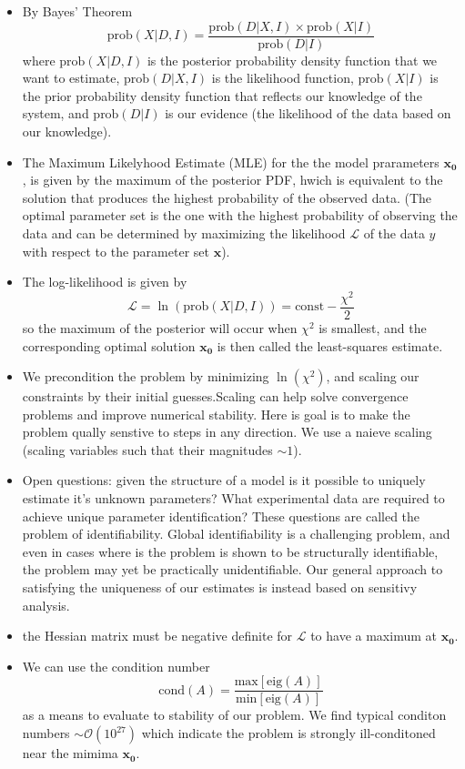 \documentclass[10pt,a4paper]{article}
\begin{document}
\begin{itemize}
\item By Bayes' Theorem
\[\mbox{prob}(X|D, I) = \frac{\mbox{prob}(D|X,I) \times \mbox{prob}(X|I)}{\mbox{prob}(D|I)}\]
where $\mbox{prob}(X|D, I)$ is the posterior probability density function that we want to estimate, $\mbox{prob}(D|X,I)$ is the likelihood function, $\mbox{prob}(X|I)$ is the prior probability density function that reflects our knowledge of the system, and $\mbox{prob}(D|I)$ is our evidence (the likelihood of the data based on our knowledge).
\item The Maximum Likelyhood Estimate (MLE) for the the model prarameters $\mathbf{x_0}$, is given by the maximum of the posterior PDF, hwich is equivalent to the solution that produces the highest probability of the observed data. (The optimal parameter set is the one with the highest probability of
observing the data and can be determined by maximizing the likelihood $\mathcal{L}$ of the data $y$ with respect to the parameter set $\mathbf{x}$).
\item The log-likelihood is given by
\[\mathcal{L} = \ln(\mbox{prob}(X|D, I)) = \mbox{const} - \frac{\chi^2}{2}\]
so the maximum of the posterior will occur when $\chi^2$ is smallest, and the corresponding optimal solution $\mathbf{x_0}$ is then called the least-squares estimate.
\item We precondition the problem by minimizing $\ln(\chi^2)$, and scaling our constraints by their initial guesses.Scaling can help solve convergence problems and improve numerical stability. Here is goal is to make the problem qually senstive to steps in any direction. We use a naieve scaling (scaling variables such that their magnitudes $\sim 1$).
\item Open questions: given the structure of a model is it possible to uniquely estimate it's unknown parameters? What experimental data are required to achieve unique parameter identification? These questions are called the problem of identifiability. Global identifiability is a challenging problem, and even in cases where is the problem is shown to be structurally identifiable, the problem may yet be practically unidentifiable. Our general approach to satisfying the uniqueness of our estimates is instead based on sensitivy analysis.
\item the Hessian matrix must be negative definite for $\mathcal{L}$ to have a maximum at $\mathbf{x_0}$.
\item We can use the condition number
\[ \mbox{cond} (A) = \frac{\mbox{max}[\mbox{eig}(A)]}{\mbox{min}[\mbox{eig}(A)]} \]
as a means to evaluate to stability of our problem. We find typical conditon numbers $\sim \mathcal{O}(10^{27})$ which indicate the problem is strongly ill-conditoned near the mimima $\mathbf{x_0}$.

\end{itemize}
\end{document}
